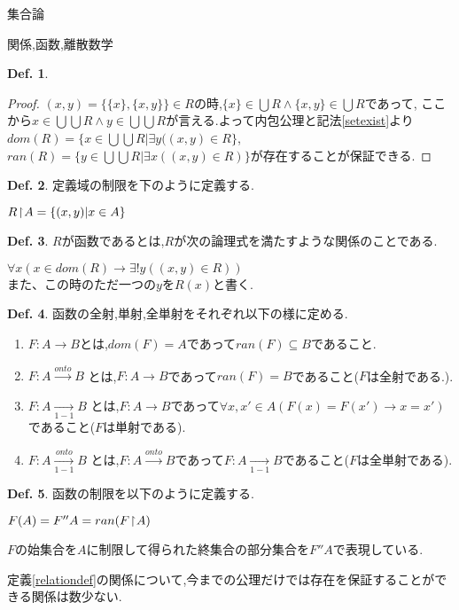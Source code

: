 \documentclass[14pt]{jsarticle}
\theoremstyle{definition}
\newtheorem{dfn}{Def.}[subsection]
\newcommand*{\subtitle}[1]{\hspace{-10pt}{\emph{\large{#1}}}\par\vspace{-0.5pt}}
\newcommand*{\newrestriction}{\hspace{-2pt}\upharpoonright\hspace{-2pt}}
\begin{document}
\begin{section}{集合論}
\begin{subsection}{関係,函数,離散数学}
\begin{dfn}
\end{dfn}
\begin{proof}
$(x,y)=\{\{x\},\{x,y\}\}\in R$の時,$\{x\}\in \bigcup R \land \{x,y\} \in \bigcup R$であって,
ここから$x \in \bigcup \bigcup R \land y \in \bigcup \bigcup R$が言える.よって内包公理と記法\ref{setexist}より
$dom(R)=\{x \in \bigcup \bigcup R|\exists y((x,y)\in R\}$,$ran(R)=\{y \in \bigcup \bigcup R | \exists x((x,y) \in R)\}$が存在することが保証できる. 
\end{proof}
\begin{dfn}
\label{relationrestriction}
	定義域の制限を下のように定義する.\par
	$R\newrestriction A = \{(x,y)|x\in A\}$
\end{dfn}
\begin{dfn}
\label{funcdef}
$R$が函数であるとは,$R$が次の論理式を満たすような関係のことである.\par
$\forall x(x \in dom(R) \to \exists !y((x,y) \in R))$\\
また、この時のただ一つの$y$を$R(x)$と書く.
\end{dfn}
\begin{dfn}
\label{funcprop}
函数の全射,単射,全単射をそれぞれ以下の様に定める.
\begin{enumerate}
	\item  $F:A \to B$とは,$dom(F)=A$であって$ran(F) \subseteq B$であること.
	\item  $F:A \xrightarrow{onto} B$ とは,$F:A \to B$であって$ran(F)=B$であること($F$は全射である.).
	\item  $F:A \xrightarrow[1-1]{} B$ とは,$F:A \to B$であって$\forall x,x'\in A(F(x)=F(x') \to x=x')$であること($F$は単射である).
	\item  $F:A \xrightarrow[1-1]{onto} B$ とは,$F:A \xrightarrow{onto} B$であって$F:A \xrightarrow[1-1]{} B$であること($F$は全単射である).
\end{enumerate}
\end{dfn}
\begin{dfn}
\label{funcrestriction}
函数の制限を以下のように定義する.\par
$F(A)=F''A=ran(F\newrestriction A)$
\end{dfn}
$F$の始集合を$A$に制限して得られた終集合の部分集合を$F''A$で表現している.\\\par
\subtitle{置換公理:$\forall x\in A \exists ! y \varphi(x,y) \to \exists B \forall x \in A \exists y \in B \varphi (x,y)$}
定義\ref{relationdef}の関係について,今までの公理だけでは存在を保証することができる関係は数少ない.

\end{subsection}
\end{section}
\end{document}
